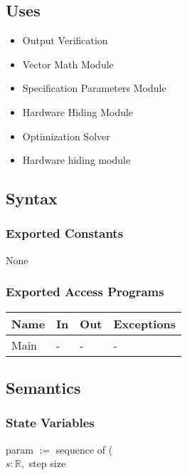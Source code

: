 \documentclass[12pt, titlepage]{article}
\begin{document}
\subsection{Uses}
\begin{itemize}
    \item Output Verification 
    \item Vector Math Module
    \item Specification Parameters Module
    \item Hardware Hiding Module
    \item Optimization Solver
\end{itemize}
\begin{itemize}
    \item Hardware hiding module
\end{itemize}

\subsection{Syntax}

\subsubsection{Exported Constants}
None
\subsubsection{Exported Access Programs}

\begin{center}
\begin{tabular}{p{2cm} p{4cm} p{4cm} p{2cm}}
\hline
\textbf{Name} & \textbf{In} & \textbf{Out} & \textbf{Exceptions} \\
\hline
Main & - & - & - \\
\hline
\end{tabular}
\end{center}

\subsection{Semantics}
\subsubsection{State Variables}
param $:=$ sequence of (
\\
$s: \mathbb{R},$ step size
\\

\end{document}
